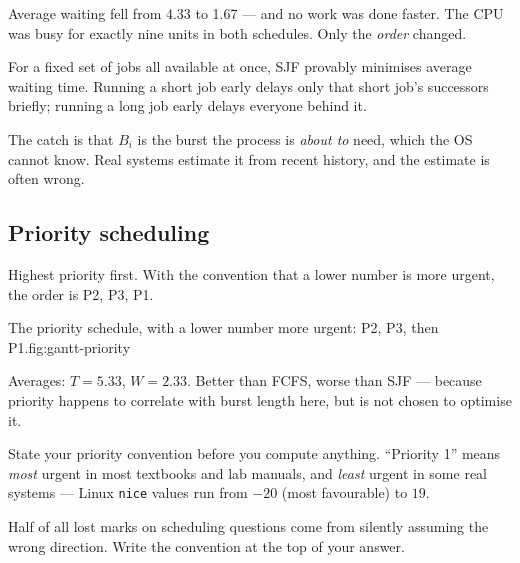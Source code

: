Average waiting fell from 4.33 to 1.67 --- and no work was done faster. The CPU was busy for exactly nine units in both schedules. Only the \emph{order} changed.

\begin{keyidea}
For a fixed set of jobs all available at once, SJF provably minimises average waiting time. Running a short job early delays only that short job's successors briefly; running a long job early delays everyone behind it.

The catch is that $B_i$ is the burst the process is \emph{about to} need, which the OS cannot know. Real systems estimate it from recent history, and the estimate is often wrong.
\end{keyidea}

\subsection{Priority scheduling}
Highest priority first. With the convention that a lower number is more urgent, the order is P2, P3, P1.

\begin{utpfig}{The priority schedule, with a lower number more urgent: P2, P3, then P1.}{fig:gantt-priority}
\end{utpfig}

Averages: $T = 5.33$, $W = 2.33$. Better than FCFS, worse than SJF --- because priority happens to correlate with burst length here, but is not chosen to optimise it.

\begin{pitfall}
State your priority convention before you compute anything. ``Priority 1'' means \emph{most} urgent in most textbooks and lab manuals, and \emph{least} urgent in some real systems --- Linux \texttt{nice} values run from $-20$ (most favourable) to $19$.

Half of all lost marks on scheduling questions come from silently assuming the wrong direction. Write the convention at the top of your answer.
\end{pitfall}

